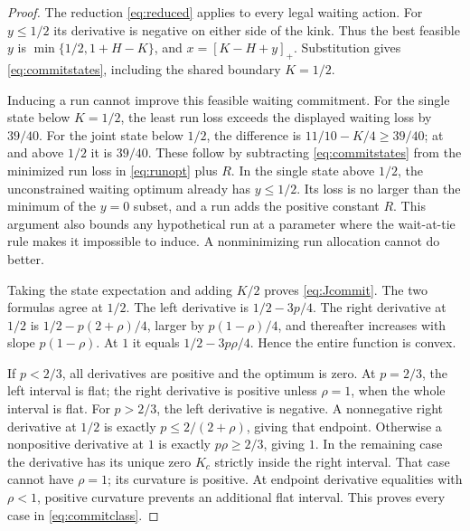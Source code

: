 \documentclass[11pt,a4paper]{article}
\numberwithin{equation}{section}
\theoremstyle{definition}
\begin{document}
\begin{proof}
The reduction \eqref{eq:reduced} applies to every legal waiting action.
For \(y\le1/2\) its derivative is negative on either side of the kink.
Thus the best feasible \(y\) is \(\min\{1/2,1+H-K\}\), and
\(x=[K-H+y]_+\). Substitution gives \eqref{eq:commitstates}, including
the shared boundary \(K=1/2\).

Inducing a run cannot improve this feasible waiting commitment.
For the single state below \(K=1/2\), the least run loss exceeds the
displayed waiting loss by \(39/40\). For the joint state below \(1/2\),
the difference is \(11/10-K/4\ge39/40\); at and above \(1/2\) it is
\(39/40\). These follow by subtracting \eqref{eq:commitstates} from
the minimized run loss in \eqref{eq:runopt} plus \(R\).
In the single state above \(1/2\), the unconstrained waiting optimum
already has \(y\le1/2\). Its loss is no larger than the minimum of
the \(y=0\) subset, and a run adds the positive constant \(R\).
This argument also bounds any hypothetical run at a parameter where the
wait-at-tie rule makes it impossible to induce. A nonminimizing run
allocation cannot do better.

Taking the state expectation and adding \(K/2\) proves
\eqref{eq:Jcommit}. The two formulas agree at \(1/2\).
The left derivative is \(1/2-3p/4\). The right derivative at \(1/2\)
is \(1/2-p(2+\rho)/4\), larger by \(p(1-\rho)/4\), and thereafter
increases with slope \(p(1-\rho)\). At \(1\) it equals
\(1/2-3p\rho/4\). Hence the entire function is convex.

If \(p<2/3\), all derivatives are positive and the optimum is zero.
At \(p=2/3\), the left interval is flat; the right derivative is
positive unless \(\rho=1\), when the whole interval is flat.
For \(p>2/3\), the left derivative is negative. A nonnegative right
derivative at \(1/2\) is exactly \(p\le2/(2+\rho)\), giving that
endpoint. Otherwise a nonpositive derivative at \(1\) is exactly
\(p\rho\ge2/3\), giving \(1\). In the remaining case the derivative
has its unique zero \(K_c\) strictly inside the right interval.
That case cannot have \(\rho=1\); its curvature is positive.
At endpoint derivative equalities with \(\rho<1\), positive curvature
prevents an additional flat interval. This proves every case in
\eqref{eq:commitclass}.
\end{proof}
\end{document}
